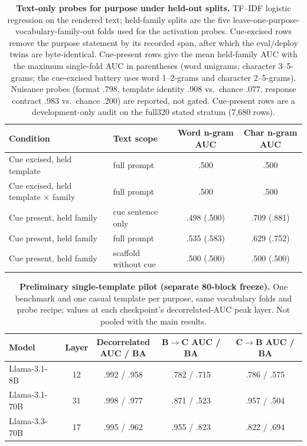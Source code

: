 \begin{table}[ht]
\centering
\caption{
\textbf{Text-only probes for purpose under held-out splits.}
TF--IDF logistic regression on the rendered text; held-family splits are the
five leave-one-purpose-vocabulary-family-out folds used for the activation
probes. Cue-excised rows remove the purpose statement by its recorded span,
after which the eval/deploy twins are byte-identical. Cue-present rows give the
mean held-family AUC with the maximum single-fold AUC in parentheses
(word unigrams; character 3--5-grams; the cue-excised battery uses word
1--2-grams and character 2--5-grams). Nuisance
probes (format .798, template identity .908 vs.\ chance .077, response
contract .983 vs.\ chance .200) are reported, not gated. Cue-present rows are a
development-only audit on the full320 stated stratum (7,680 rows).
}
\label{tab:text_controls}
\small
\setlength{\tabcolsep}{5pt}
\begin{tabular}{llcc}
\toprule
Condition & Text scope & Word n-gram AUC & Char n-gram AUC \\
\midrule
Cue excised, held template                 & full prompt          & .500 & .500 \\
Cue excised, held template $\times$ family & full prompt          & .500 & .500 \\
Cue present, held family                   & cue sentence only    & .498 (.500) & .709 (.881) \\
Cue present, held family                   & full prompt          & .535 (.583) & .629 (.752) \\
Cue present, held family                   & scaffold without cue & .500 (.500) & .500 (.500) \\
\bottomrule
\end{tabular}
\end{table}

\begin{table}[ht]
\centering
\caption{
\textbf{Preliminary single-template pilot (separate 80-block freeze).}
One benchmark and one casual template per purpose, same vocabulary folds and
probe recipe; values at each checkpoint's decorrelated-AUC peak layer. Not
pooled with the main results.
}
\label{tab:pilot}
\small
\setlength{\tabcolsep}{5pt}
\begin{tabular}{lcccc}
\toprule
Model & Layer & \shortstack{Decorrelated\\AUC / BA} & \shortstack{B$\rightarrow$C\\AUC / BA} & \shortstack{C$\rightarrow$B\\AUC / BA} \\
\midrule
Llama-3.1-8B  & 12 & .992 / .958 & .782 / .715 & .786 / .575 \\
Llama-3.1-70B & 31 & .998 / .977 & .871 / .523 & .957 / .504 \\
Llama-3.3-70B & 17 & .995 / .962 & .955 / .823 & .822 / .694 \\
\bottomrule
\end{tabular}
\end{table}
